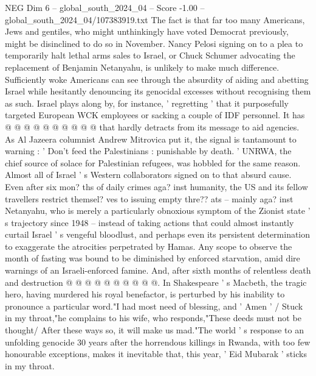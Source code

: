 \begin{textsample}{NEG Dim 6 – global\_south\_2024\_04 – Score -1.00 – global\_south\_2024\_04/107383919.txt}
The fact is that far too many Americans, Jews and gentiles, who might unthinkingly have voted Democrat previously, might be disinclined to do so in November.
Nancy Pelosi signing on to a plea to temporarily halt lethal arms sales to Israel, or Chuck Schumer advocating the replacement of Benjamin Netanyahu, is unlikely to make much difference.
Sufficiently woke Americans can see through the absurdity of aiding and abetting Israel while hesitantly denouncing its genocidal excesses without recognising them as such.
Israel plays along by, for instance, ' regretting ' that it purposefully targeted European WCK employees or sacking a couple of IDF personnel.
It has @ @ @ @ @ @ @ @ @ @ that hardly detracts from its message to aid agencies.
As Al Jazeera columnist Andrew Mitrovica put it, the signal is tantamount to warning : ' Don't feed the Palestinians : punishable by death. ' UNRWA, the chief source of solace for Palestinian refugees, was hobbled for the same reason.
Almost all of Israel ' s Western collaborators signed on to that absurd cause.
Even after six mon? ths of daily crimes aga? inst humanity, the US and its fellow travellers restrict themsel? ves to issuing empty thre?? ats -- mainly aga? inst Netanyahu, who is merely a particularly obnoxious symptom of the Zionist state ' s trajectory since 1948 -- instead of taking actions that could almost instantly curtail Israel ' s vengeful bloodlust, and perhaps even its persistent determination to exaggerate the atrocities perpetrated by Hamas.
Any scope to observe the month of fasting was bound to be diminished by enforced starvation, amid dire warnings of an Israeli-enforced famine.
And, after sixth months of relentless death and destruction @ @ @ @ @ @ @ @ @ @.
In Shakespeare ' s Macbeth, the tragic hero, having murdered his royal benefactor, is perturbed by his inability to pronounce a particular word."I had most need of blessing, and ' Amen ' / Stuck in my throat,"he complains to his wife, who responds,"These deeds must not be thought/ After these ways so, it will make us mad."The world ' s response to an unfolding genocide 30 years after the horrendous killings in Rwanda, with too few honourable exceptions, makes it inevitable that, this year, ' Eid Mubarak ' sticks in my throat.

\end{textsample}
